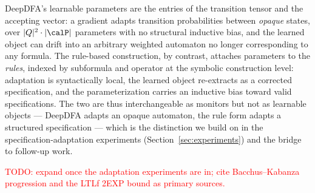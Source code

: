 DeepDFA's learnable parameters are the entries of the transition tensor and the accepting vector: a gradient adapts transition probabilities between \emph{opaque} states, over $|Q|^2 \cdot |\calP|$ parameters with no structural inductive bias, and the learned object can drift into an arbitrary weighted automaton no longer corresponding to any \ltlf formula. The rule-based construction, by contrast, attaches parameters to the \emph{rules}, indexed by subformula and operator at the symbolic construction level: adaptation is syntactically local, the learned object re-extracts as a corrected specification, and the parameterization carries an inductive bias toward valid specifications. The two are thus interchangeable as monitors but not as learnable objects --- DeepDFA adapts an opaque automaton, the rule form adapts a structured specification --- which is the distinction we build on in the specification-adaptation experiments (Section~\ref{sec:experiments}) and the bridge to follow-up work.

\textcolor{red}{TODO: expand once the adaptation experiments are in; cite Bacchus--Kabanza progression and the LTLf 2EXP bound as primary sources.}

